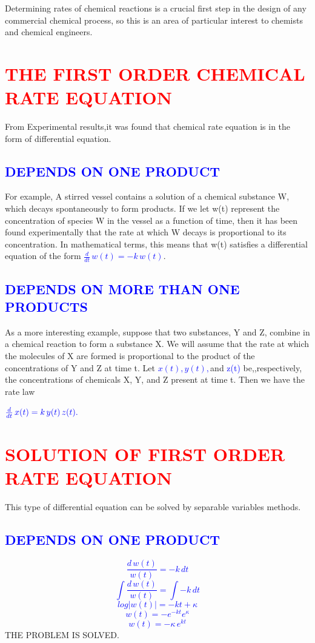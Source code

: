 \documentclass[12pt]{article}
\begin{document}
        Determining rates of chemical reactions is a crucial first step in the design of any commercial chemical process, so this is an area of particular interest to chemists and chemical engineers.   
                                           


\section{\textcolor{red}{ THE FIRST ORDER CHEMICAL RATE EQUATION }}
\textsf
From Experimental results,it was found that chemical rate equation is in the form of differential equation.
\subsection{\textcolor{blue}{DEPENDS ON ONE PRODUCT}}
\textsf
		For example, A stirred vessel contains a solution of a chemical substance W, which decays spontaneously to form products. If we let w(t) represent the concentration of species W in the vessel as a function of time, then it has been found experimentally that the rate at which W decays is proportional to its concentration. In mathematical terms, this means that w(t) satisfies a differential equation of the form 
\textcolor{blue}{$\frac{d}{dt}\,w(t)=-k\,w(t)$}.\\
\subsection{\textcolor{blue}{DEPENDS ON MORE THAN ONE PRODUCTS}}
\textsf
As a more interesting example, suppose that two substances, Y and Z, combine in a chemical reaction to form a substance X. We will assume that the rate at which the molecules of X are formed is proportional to the product of the concentrations of Y and Z at time t. Let \textcolor{blue}{$x(t),y(t),$}and \textcolor{blue}{z(t)} be,,respectively, the concentrations of chemicals X, Y, and Z present at time t. Then we have the rate law 

$\textcolor{blue}{\frac{d}{dt}\,x(t)=k\,y(t)\,z(t).}$

\newpage
\section{\textcolor{red}{ SOLUTION OF FIRST ORDER RATE EQUATION }}
\textsf
This type of differential equation can be solved by separable variables methods.
\subsection{\textcolor{blue}{ DEPENDS ON ONE PRODUCT }}
\large
{
\textcolor{blue}{$$ \frac{d\,w(t)}{w(t)}=-k\,dt$$
$$\int{\frac{d\,w(t)}{w(t)}}=\int{-k\,dt}$$
$$log{|w(t)|}=-kt+\kappa$$
$$w(t)=-e^{-kt}e^{\kappa}$$
$$w(t)=-\kappa\,e^{kt}$$}}
THE PROBLEM IS SOLVED.
\end{document}
